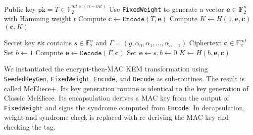 \documentclass[runningheads]{llncs}
\newcommand{\pk}{\texttt{pk}}
\newcommand{\sk}{\texttt{sk}}
\newcommand{\wt}{\mathop{wt}}
\begin{document}
\begin{algorithm}
    \caption{$\texttt{Encap}(\pk)$}\label{alg:mceliece-encap}
    \begin{algorithmic}[1]
        \Require Public key $\pk = T\in\mathbb{F}_2^{mt \times (n - mt)}$
        \State Use \texttt{FixedWeight} to generate a vector $\mathbf{e} \in \mathbf{F}_2^n$ with Hamming weight $t$
        \State Compute $\mathbf{c} \leftarrow \texttt{Encode}(T, \mathbf{e})$
        \State Compute $K \leftarrow H(1, \mathbf{e}, \mathbf{c})$
        \State \Return $(\mathbf{c}, K)$
    \end{algorithmic}
\end{algorithm}

\begin{algorithm}
    \caption{$\texttt{Decap}(\sk, \mathbf{c})$}\label{alg:mceliece-decap}
    \begin{algorithmic}[1]
        \Require Secret key $\sk$ contains $s \in \mathbb{F}_2^n$ and $\Gamma = (g, \alpha_0, \alpha_1, \ldots, \alpha_{n-1})$
        \Require Ciphertext $\mathbf{c} \in \mathbb{F}_2^{mt}$
        \State Set $b \leftarrow 1$
        \State Compute $\mathbf{e} \leftarrow \texttt{Decode}(\Gamma, \mathbf{c})$
        \If{$\wt(\mathbf{e})\neq t \lor H\mathbf{e}\neq\mathbf{c}$}
            \State Set $\mathbf{e} \leftarrow s, b \leftarrow 0$
        \EndIf
        \State \Return $K \leftarrow H(b, \mathbf{e}, \mathbf{c})$
    \end{algorithmic}
\end{algorithm}

We instantiated the encrypt-then-MAC KEM transformation using \\ \texttt{SeededKeyGen}, \texttt{FixedWeight}, \texttt{Encode}, and \texttt{Decode} as sub-routines. The result is called McEliece+. Its key generation routine is identical to the key generation of Classic McEliece. Its encapsulation derives a MAC key from the output of \texttt{FixedWeight} and signs the syndrome computed from \texttt{Encode}. In decapsulation, weight and syndrome check is replaced with re-deriving the MAC key and checking the tag.
\end{document}
